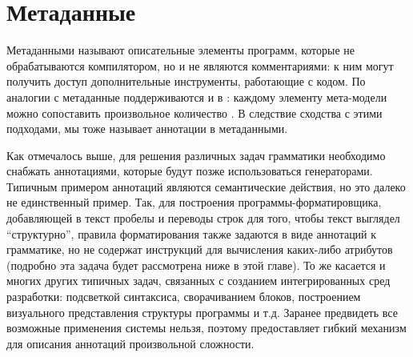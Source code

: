 \section{Метаданные}

Метаданными называют описательные элементы программ, которые не обрабатываются компилятором, но и не являются комментариями: к ним могут получить доступ дополнительные инструменты, работающие с кодом. По аналогии с  метаданные поддерживаются и в : каждому элементу мета-модели можно сопоставить произвольное количество . В следствие сходства с этими подходами, мы тоже называет аннотации в  метаданными.

Как отмечалось выше, для решения различных задач грамматики необходимо снабжать аннотациями, которые будут позже использоваться генераторами. Типичным примером аннотаций являются семантические действия, но это далеко не единственный пример. Так, для построения программы-форматировщика, добавляющей в текст пробелы и переводы строк для того, чтобы текст выглядел ``структурно'', правила форматирования также задаются в виде аннотаций к грамматике, но не содержат инструкций для вычисления каких-либо атрибутов (подробно эта задача будет рассмотрена ниже в этой главе). То же касается и многих других типичных задач, связанных с созданием интегрированных сред разработки: подсветкой синтаксиса, сворачиванием блоков, построением визуального представления структуры программы и т.д. Заранее предвидеть все возможные применения системы нельзя, поэтому  предоставляет гибкий механизм для описания аннотаций произвольной сложности.

